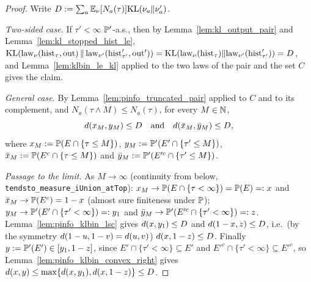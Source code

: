 \begin{proof}
\leanok
Write $D := \sum_a\mathbb{E}_\nu[N_a(\tau)]\mathrm{KL}(\nu_a\|\nu'_a)$.

\emph{Two-sided case.} If $\tau' < \infty$ $\mathbb{P}'$-a.s., then by Lemma~\ref{lem:kl_output_pair}
and Lemma~\ref{lem:kl_stopped_hist_le},
$\mathrm{KL}(\mathrm{law}_\nu(\mathrm{hist}_\tau,\mathrm{out})\,\|\,\mathrm{law}_{\nu'}(\mathrm{hist}'_{\tau'},\mathrm{out}'))
= \mathrm{KL}(\mathrm{law}_\nu(\mathrm{hist}_\tau)\|\mathrm{law}_{\nu'}(\mathrm{hist}'_{\tau'})) = D$, and
Lemma~\ref{lem:klbin_le_kl} applied to the two laws of the pair and the set $C$ gives the claim.

\emph{General case.} By Lemma~\ref{lem:pinfo_truncated_pair} applied to $C$ and to its
complement, and $N_a(\tau\wedge M) \le N_a(\tau)$, for every $M \in \mathbb{N}$,
\[
  d(x_M, y_M) \le D \quad\text{and}\quad d(\bar x_M, \bar y_M) \le D,
\]
where $x_M := \mathbb{P}(E \cap \{\tau \le M\})$, $y_M := \mathbb{P}'(E' \cap \{\tau' \le M\})$,
$\bar x_M := \mathbb{P}(E^c \cap \{\tau\le M\})$ and $\bar y_M := \mathbb{P}'(E'^c \cap \{\tau'\le M\})$.

\emph{Passage to the limit.} As $M \to \infty$ (continuity from below,
\texttt{tendsto\_measure\_iUnion\_atTop}): $x_M \to \mathbb{P}(E \cap \{\tau<\infty\}) = \mathbb{P}(E) =: x$
and $\bar x_M \to \mathbb{P}(E^c) = 1 - x$ (almost sure finiteness under $\mathbb{P}$);
$y_M \to \mathbb{P}'(E' \cap \{\tau'<\infty\}) =: y_1$ and
$\bar y_M \to \mathbb{P}'(E'^c \cap \{\tau'<\infty\}) =: z$. Lemma~\ref{lem:pinfo_klbin_lsc} gives
$d(x, y_1) \le D$ and $d(1 - x, z) \le D$, i.e.\ (by the symmetry
$d(1-u, 1-v) = d(u, v)$) $d(x, 1 - z) \le D$. Finally
$y := \mathbb{P}'(E') \in [y_1, 1 - z]$, since $E' \cap \{\tau' < \infty\} \subseteq E'$ and
$E'^c \cap \{\tau' < \infty\} \subseteq E'^c$, so Lemma~\ref{lem:pinfo_klbin_convex_right} gives
$d(x, y) \le \max\{d(x,y_1), d(x, 1 - z)\} \le D$.
\end{proof}

